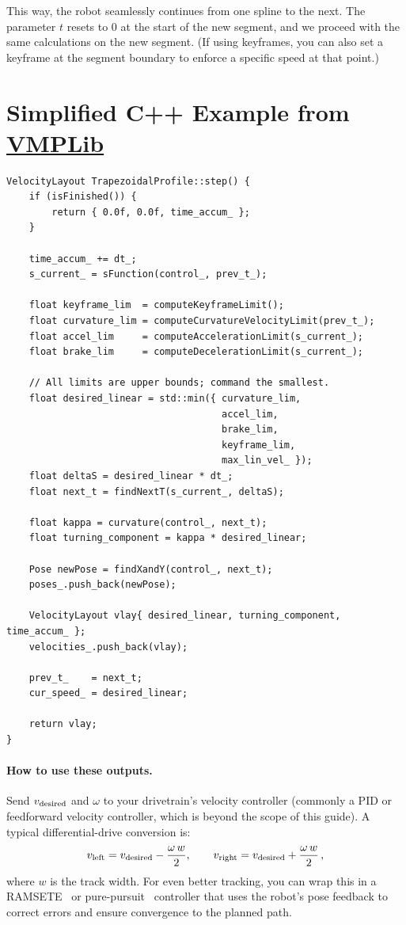 \documentclass[11pt]{article}
\begin{document}
This way, the robot seamlessly continues from one spline to the next. The parameter $t$ resets to 0 at the start of the new segment, and we proceed with the same calculations on the new segment. (If using keyframes, you can also set a keyframe at the segment boundary to enforce a specific speed at that point.)

\section{Simplified C++ Example from \href{https://github.com/SerrialError/vmplib}{VMPLib}}


\begin{lstlisting}
VelocityLayout TrapezoidalProfile::step() {
    if (isFinished()) {
        return { 0.0f, 0.0f, time_accum_ };
    }

    time_accum_ += dt_;
    s_current_ = sFunction(control_, prev_t_);

    float keyframe_lim  = computeKeyframeLimit();
    float curvature_lim = computeCurvatureVelocityLimit(prev_t_);
    float accel_lim     = computeAccelerationLimit(s_current_);
    float brake_lim     = computeDecelerationLimit(s_current_);

    // All limits are upper bounds; command the smallest.
    float desired_linear = std::min({ curvature_lim,
                                      accel_lim,
                                      brake_lim,
                                      keyframe_lim,
                                      max_lin_vel_ });
    float deltaS = desired_linear * dt_;
    float next_t = findNextT(s_current_, deltaS);

    float kappa = curvature(control_, next_t);
    float turning_component = kappa * desired_linear;

    Pose newPose = findXandY(control_, next_t);
    poses_.push_back(newPose);

    VelocityLayout vlay{ desired_linear, turning_component, time_accum_ };
    velocities_.push_back(vlay);

    prev_t_    = next_t;
    cur_speed_ = desired_linear;

    return vlay;
}
\end{lstlisting}

\paragraph{How to use these outputs.} Send \(v_{\rm desired}\) and \(\omega\) to your drivetrain’s velocity controller (commonly a PID or feedforward velocity controller, which is beyond the scope of this guide). A typical differential-drive conversion is:
\[
v_{\rm left}  = v_{\rm desired} - \frac{\omega\,w}{2},\qquad
v_{\rm right} = v_{\rm desired} + \frac{\omega\,w}{2}\,,
\] 
where $w$ is the track width. For even better tracking, you can wrap this in a RAMSETE~\cite{ramsete,veness} or pure-pursuit~\cite{coulter} controller that uses the robot’s pose feedback to correct errors and ensure convergence to the planned path.
\end{document}
